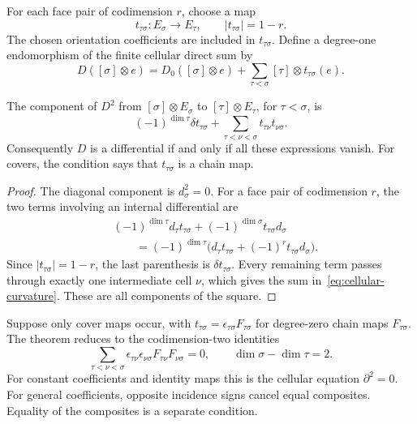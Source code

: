 For each face pair of codimension $r$, choose a map
\[
 t_{\tau\sigma}:E_\sigma\longrightarrow E_\tau,
 \qquad |t_{\tau\sigma}|=1-r.
\]
The chosen orientation coefficients are included in $t_{\tau\sigma}$.
Define a degree-one endomorphism of the finite cellular direct sum by
\[
 D([\sigma]\otimes e)=D_0([\sigma]\otimes e)
       +\sum_{\tau<\sigma}[\tau]\otimes t_{\tau\sigma}(e).
\]

\begin{theorem}\label{thm:cellular-curvature}
The component of $D^2$ from $[\sigma]\otimes E_\sigma$
to $[\tau]\otimes E_\tau$, for $\tau<\sigma$, is
\begin{equation}\label{eq:cellular-curvature}
 (-1)^{\dim\tau}\delta t_{\tau\sigma}
 +\sum_{\tau<\nu<\sigma}t_{\tau\nu}t_{\nu\sigma}.
\end{equation}
Consequently $D$ is a differential if and only if all these expressions vanish.
For covers, the condition says that $t_{\tau\sigma}$ is a chain map.
\end{theorem}
\begin{proof}
The diagonal component is $d_\sigma^2=0$.
For a face pair of codimension $r$, the two terms involving an internal
differential are
\[
 \begin{aligned}
 &(-1)^{\dim\tau}d_\tau t_{\tau\sigma}
       +(-1)^{\dim\sigma}t_{\tau\sigma}d_\sigma\\
 &\qquad =(-1)^{\dim\tau}
       \bigl(d_\tau t_{\tau\sigma}+(-1)^r
                        t_{\tau\sigma}d_\sigma\bigr).
 \end{aligned}
\]
Since $|t_{\tau\sigma}|=1-r$, the last parenthesis is
$\delta t_{\tau\sigma}$.
Every remaining term passes through exactly one intermediate cell $\nu$,
which gives the sum in~\eqref{eq:cellular-curvature}.
These are all components of the square.
\end{proof}

Suppose only cover maps occur, with
$t_{\tau\sigma}=\epsilon_{\tau\sigma}F_{\tau\sigma}$
for degree-zero chain maps $F_{\tau\sigma}$.
The theorem reduces to the codimension-two identities
\begin{equation}\label{eq:strict-corner-identity}
 \sum_{\tau<\nu<\sigma}
 \epsilon_{\tau\nu}\epsilon_{\nu\sigma}
 F_{\tau\nu}F_{\nu\sigma}=0,
 \qquad \dim\sigma-\dim\tau=2.
\end{equation}
For constant coefficients and identity maps this is the cellular equation
$\partial^2=0$.
For general coefficients, opposite incidence signs cancel equal composites.
Equality of the composites is a separate condition.

